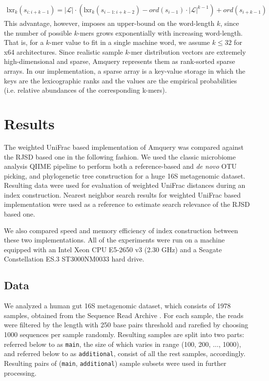 \documentclass[10pt,letterpaper]{article}
\begin{document}
\begin{eqnarray}
\label{eq:schemeP}
    \mathrm{lxr}_k(s_{i:i+k-1}) = |{\mathcal{L}}| \cdot (\mathrm{lxr}_k(s_{i−1:i+k-2}) − ord(s_{i−1}) \cdot 
									 |{\mathcal{L}}|^{k−1}) + ord(s_{i+k−1})
\end{eqnarray}
This advantage, however, imposes an upper-bound on the word-length $k$, since the number of possible $k$-mers grows exponentially with increasing word-length. That is, for a $k$-mer value to fit in a single machine word, we assume $k \leq 32$ for x64 architectures.
Since realistic sample ${k}$-mer distribution vectors are extremely high-dimensional and sparse, Amquery represents them as rank-sorted sparse arrays. In our implementation, a sparse array is a key-value storage in which the keys are the lexicographic ranks and the values are the empirical probabilities (i.e. relative abundances of the corresponding k-mers).




\section*{Results}

The weighted UniFrac based implementation of Amquery was compared against the RJSD based one in the following fashion.
We used the classic microbiome analysis QIIME \cite{caporaso2010qiime} pipeline to perform both a reference-based and \textit{de novo} OTU picking, 
and phylogenetic tree construction for a huge 16S metagenomic dataset.
Resulting data were used for evaluation of weighted UniFrac distances during an index construction. 
Nearest neighbor search results for weighted UniFrac based implementation were used as a reference to estimate 
search relevance of the RJSD based one.

We also compared speed and memory efficiency of index construction between these two implementations.
All of the experiments were run on a machine equipped with an Intel Xeon CPU E5-2650 v3 (2.30 GHz)
 and a Seagate Constellation ES.3 ST3000NM0033 hard drive.

\subsection*{Data}
We analyzed a human gut 16S metagenomic dataset, which consists of 1978 samples, obtained from the Sequence Read Archive \cite{leinonen2010sequence}. 
For each sample, the reads were filtered by the length with 250 base pairs threshold and rarefied by choosing 1000 sequences per sample randomly.
Resulting samples are split into two parts: referred below to as \texttt{main}, the size of which varies in range (100, 200, $\dots$, 1000), and referred below to as \texttt{additional}, 
consist of all the rest samples, accordingly. Resulting pairs of (\texttt{main}, \texttt{additional}) sample subsets were used in further processing.
\end{document}
